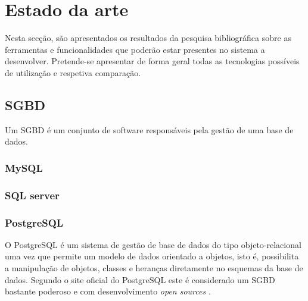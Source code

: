 \chapter{Estado da arte}
\label{state}


Nesta secção, são apresentados os resultados da pesquisa bibliográfica sobre as ferramentas e funcionalidades que poderão estar presentes no sistema a desenvolver. Pretende-se apresentar de forma geral todas as tecnologias possíveis de utilização e respetiva comparação. 


\section{\acl{SGBD}}

Um \ac{SGBD} é um conjunto de software responsáveis pela gestão de uma base de dados.






\subsection{MySQL}



\subsection{SQL server}



\subsection{PostgreSQL}

O PostgreSQL é um sistema de gestão de base de dados do tipo objeto-relacional uma vez que permite um modelo de dados orientado a objetos, isto é, possibilita a manipulação de objetos, classes e heranças diretamente no esquemas da base de dados. Segundo o site oficial do PostgreSQL este é considerado um \ac{SGBD} bastante poderoso e com desenvolvimento \textit{open sources} \cite{ThePostgreSQLGlobalDevelopmentGroup2012}. 





